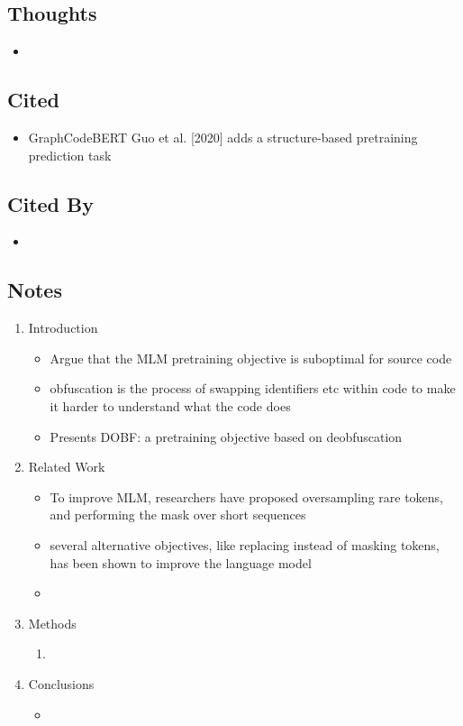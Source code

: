 \documentclass{article}
\begin{document}
\subsection*{Thoughts}
\begin{itemize}
	\item
\end{itemize}

\subsection*{Cited}
\begin{itemize}
	\item GraphCodeBERT Guo et al. [2020] adds a structure-based pretraining prediction task
\end{itemize}

\subsection*{Cited By}
\begin{itemize}
	\item
\end{itemize}

\subsection*{Notes}

\begin{enumerate}
	\item Introduction
	\begin{itemize}
		\item Argue that the MLM pretraining objective is suboptimal for source code 
		\item obfuscation is the process of swapping identifiers etc within code to make it harder to understand what the code does
		\item Presents DOBF: a pretraining objective based on deobfuscation
	\end{itemize}
	\item Related Work
	\begin{itemize}
		\item To improve MLM, researchers have proposed oversampling rare tokens, and performing the mask over short sequences
		\item several alternative objectives, like replacing instead of masking tokens, has been shown to improve the language model
		\item 
	\end{itemize}
	\item Methods
	\begin{enumerate}
		\item 
	\end{enumerate}
	\item Conclusions
	\begin{itemize}
		\item 
	\end{itemize}
\end{enumerate}
\end{document}
